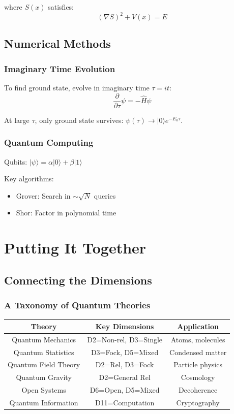 \documentclass[12pt,oneside]{book}
\begin{document}
where $S(x)$ satisfies:
$$(\nabla S)^2 + V(x) = E$$

\chapter{Numerical Methods}

\section{Imaginary Time Evolution}

To find ground state, evolve in imaginary time $\tau = it$:
$$\frac{\partial}{\partial\tau}\psi = -\hat{H}\psi$$

At large $\tau$, only ground state survives: $\psi(\tau) \to |0\rangle e^{-E_0\tau}$.

\section{Quantum Computing}

Qubits: $|\psi\rangle = \alpha|0\rangle + \beta|1\rangle$

Key algorithms:
\begin{itemize}
  \item Grover: Search in $\sim\sqrt{N}$ queries
  \item Shor: Factor in polynomial time
\end{itemize}

\part{Putting It Together}

\chapter{Connecting the Dimensions}

\section{A Taxonomy of Quantum Theories}

\begin{center}
\begin{tabular}{|c|c|c|}
\hline
\textbf{Theory} & \textbf{Key Dimensions} & \textbf{Application} \\
\hline
Quantum Mechanics & D2=Non-rel, D3=Single & Atoms, molecules \\
\hline
Quantum Statistics & D3=Fock, D5=Mixed & Condensed matter \\
\hline
Quantum Field Theory & D2=Rel, D3=Fock & Particle physics \\
\hline
Quantum Gravity & D2=General Rel & Cosmology \\
\hline
Open Systems & D6=Open, D5=Mixed & Decoherence \\
\hline
Quantum Information & D11=Computation & Cryptography \\
\hline
\end{tabular}
\end{center}
\end{document}
